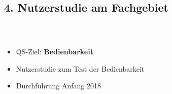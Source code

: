 \documentclass[accentcolor=tud1b,colorbacktitle,landscape,german,presentation]{tudbeamer}
\newcommand{\ftitle}{
	\frametitle{\insertsectionhead \\ {\small \insertsubsectionhead}}
}
\begin{document}
\subsection{4. Nutzerstudie am Fachgebiet}
\begin{frame}
	\ftitle
	\centering
	\vspace{-1.2cm}
	\vspace{-4.5cm}
	\begin{itemize}
		\item QS-Ziel: \textbf{Bedienbarkeit}\pause
		\item Nutzerstudie zum Test der Bedienbarkeit\pause
		\item Durchführung Anfang 2018
	\end{itemize}
\end{frame}
\end{document}
